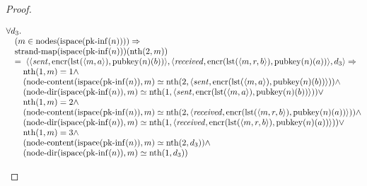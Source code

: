 \documentclass[11pt]{article}
\theoremstyle{plain}
\begin{document}
\begin{proof}
\begin{itemize}[leftmargin=2.8em, itemsep=4pt, parsep=1pt]
\begin{itemize}[leftmargin=2.8em, itemsep=4pt, parsep=1pt]
\begin{equation*}
\begin{array}{@{}l@{}}
\begin{array}{@{}l@{}} \forall d_{3}. \\ \quad (m \in \operatorname{nodes}(\operatorname{ispace}(\operatorname{pk\text{-}inf}(n)))) \Rightarrow  \\ \quad \operatorname{strand\text{-}map}(\operatorname{ispace}(\operatorname{pk\text{-}inf}(n)))(\operatorname{nth}(2, m)) \\ \quad =\; \langle \langle \mathit{sent}, \operatorname{encr}(\operatorname{lst}(\langle m, a \rangle), \operatorname{pubkey}(n)(b)) \rangle, \langle \mathit{received}, \operatorname{encr}(\operatorname{lst}(\langle m, r, b \rangle), \operatorname{pubkey}(n)(a)) \rangle, d_{3} \rangle \Rightarrow \\ \quad \quad \operatorname{nth}(1, m) = 1 \wedge \\ \quad \quad (\operatorname{node\text{-}content}(\operatorname{ispace}(\operatorname{pk\text{-}inf}(n)), m) \simeq \operatorname{nth}(2, \langle \mathit{sent}, \operatorname{encr}(\operatorname{lst}(\langle m, a \rangle), \operatorname{pubkey}(n)(b)) \rangle)) \wedge \\ \quad \quad (\operatorname{node\text{-}dir}(\operatorname{ispace}(\operatorname{pk\text{-}inf}(n)), m) \simeq \operatorname{nth}(1, \langle \mathit{sent}, \operatorname{encr}(\operatorname{lst}(\langle m, a \rangle), \operatorname{pubkey}(n)(b)) \rangle)) \vee \\ \quad \quad \operatorname{nth}(1, m) = 2 \wedge \\ \quad \quad (\operatorname{node\text{-}content}(\operatorname{ispace}(\operatorname{pk\text{-}inf}(n)), m) \simeq \operatorname{nth}(2, \langle \mathit{received}, \operatorname{encr}(\operatorname{lst}(\langle m, r, b \rangle), \operatorname{pubkey}(n)(a)) \rangle)) \wedge \\ \quad \quad (\operatorname{node\text{-}dir}(\operatorname{ispace}(\operatorname{pk\text{-}inf}(n)), m) \simeq \operatorname{nth}(1, \langle \mathit{received}, \operatorname{encr}(\operatorname{lst}(\langle m, r, b \rangle), \operatorname{pubkey}(n)(a)) \rangle)) \vee \\ \quad \quad \operatorname{nth}(1, m) = 3 \wedge \\ \quad \quad (\operatorname{node\text{-}content}(\operatorname{ispace}(\operatorname{pk\text{-}inf}(n)), m) \simeq \operatorname{nth}(2, d_{3})) \wedge \\ \quad \quad (\operatorname{node\text{-}dir}(\operatorname{ispace}(\operatorname{pk\text{-}inf}(n)), m) \simeq \operatorname{nth}(1, d_{3})) \end{array} \\

\end{array}
\end{equation*}
\end{itemize}
\end{itemize}
\end{proof}
\end{document}
